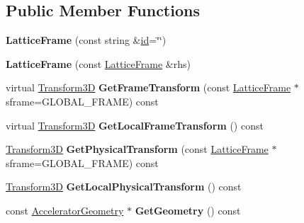 \subsection*{Public Member Functions}
\begin{DoxyCompactItemize}
\item 
\mbox{\label{classLatticeFrame_a494317af9e915e21c3a82b9385b92eec}} 
{\bfseries Lattice\+Frame} (const string \&\hyperlink{classModelElement_aada171ead2085c75b592cf07d91bc5c2}{id}=\char`\"{}\char`\"{})
\item 
\mbox{\label{classLatticeFrame_a89733fe81d51902a4674b86d794c9e65}} 
{\bfseries Lattice\+Frame} (const \hyperlink{classLatticeFrame}{Lattice\+Frame} \&rhs)
\item 
\mbox{\label{classLatticeFrame_a1819cd3de57f80adf6df6a45d877836d}} 
virtual \hyperlink{classTransform3D}{Transform3D} {\bfseries Get\+Frame\+Transform} (const \hyperlink{classLatticeFrame}{Lattice\+Frame} $\ast$sframe=G\+L\+O\+B\+A\+L\+\_\+\+F\+R\+A\+ME) const
\item 
\mbox{\label{classLatticeFrame_a3f6fe51d31dc37ae61c1433e3da18a2a}} 
virtual \hyperlink{classTransform3D}{Transform3D} {\bfseries Get\+Local\+Frame\+Transform} () const
\item 
\mbox{\label{classLatticeFrame_a327a991935c17cf2f36d2a6902435e70}} 
\hyperlink{classTransform3D}{Transform3D} {\bfseries Get\+Physical\+Transform} (const \hyperlink{classLatticeFrame}{Lattice\+Frame} $\ast$sframe=G\+L\+O\+B\+A\+L\+\_\+\+F\+R\+A\+ME) const
\item 
\mbox{\label{classLatticeFrame_aff23afda9016c4a74994fc980fd1b9fe}} 
\hyperlink{classTransform3D}{Transform3D} {\bfseries Get\+Local\+Physical\+Transform} () const
\item 
\mbox{\label{classLatticeFrame_ae0596f5e2af2dfb8096bb851ee96eecf}} 
const \hyperlink{classAcceleratorGeometry}{Accelerator\+Geometry} $\ast$ {\bfseries Get\+Geometry} () const
\item 
\mbox{\label{classLatticeFrame_a44ffa8c7f79e259569805758170c9e15}} 

\end{DoxyCompactItemize}
